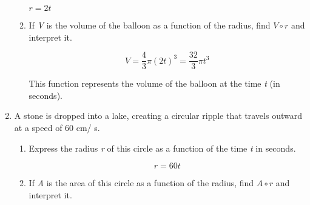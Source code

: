 \documentclass{article}
\begin{document}
\begin{enumerate}
\begin{enumerate}
			$r = 2t$
			
			\item If \emph{V} is the volume of the balloon as a function of the radius, find $V \circ r$ and interpret
				it.

			$$V = \frac{4}{3}\pi(2t)^3 = \frac{32}{3}\pi t^3$$
			
			This function represents the volume of the balloon at the time \emph{t} (in seconds).
				
		\end{enumerate}
		
		\item A stone is dropped into a lake, creating a circular ripple that travels outward at a speed of 60 cm/ s.
		
		\begin{enumerate}
		
			\item Express the radius \emph{r} of this circle as a function of the time \emph{t} in seconds.
			
				$$r = 60t$$
				
			\item If \emph{A} is the area of this circle as a function of the radius, find $A \circ r$ and interpret it.
			
				
		\end{enumerate}

	\end{enumerate}
\end{document}

